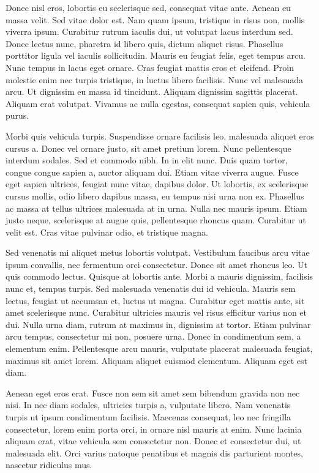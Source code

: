 Donec nisl eros, lobortis eu scelerisque sed, consequat vitae ante. Aenean eu massa velit. Sed vitae dolor est. Nam quam ipsum, tristique in risus non, mollis viverra ipsum. Curabitur rutrum iaculis dui, ut volutpat lacus interdum sed. Donec lectus nunc, pharetra id libero quis, dictum aliquet risus. Phasellus porttitor ligula vel iaculis sollicitudin. Mauris eu feugiat felis, eget tempus arcu. Nunc tempus in lacus eget ornare. Cras feugiat mattis eros et eleifend. Proin molestie enim nec turpis tristique, in luctus libero facilisis. Nunc vel malesuada arcu. Ut dignissim eu massa id tincidunt. Aliquam dignissim sagittis placerat. Aliquam erat volutpat. Vivamus ac nulla egestas, consequat sapien quis, vehicula purus.

Morbi quis vehicula turpis. Suspendisse ornare facilisis leo, malesuada aliquet eros cursus a. Donec vel ornare justo, sit amet pretium lorem. Nunc pellentesque interdum sodales. Sed et commodo nibh. In in elit nunc. Duis quam tortor, congue congue sapien a, auctor aliquam dui. Etiam vitae viverra augue. Fusce eget sapien ultrices, feugiat nunc vitae, dapibus dolor. Ut lobortis, ex scelerisque cursus mollis, odio libero dapibus massa, eu tempus nisi urna non ex. Phasellus ac massa at tellus ultrices malesuada at in urna. Nulla nec mauris ipsum. Etiam justo neque, scelerisque at augue quis, pellentesque rhoncus quam. Curabitur ut velit est. Cras vitae pulvinar odio, et tristique magna.

Sed venenatis mi aliquet metus lobortis volutpat. Vestibulum faucibus arcu vitae ipsum convallis, nec fermentum orci consectetur. Donec sit amet rhoncus leo. Ut quis commodo lectus. Quisque at lobortis ante. Morbi a mauris dignissim, facilisis nunc et, tempus turpis. Sed malesuada venenatis dui id vehicula. Mauris sem lectus, feugiat ut accumsan et, luctus ut magna. Curabitur eget mattis ante, sit amet scelerisque nunc. Curabitur ultricies mauris vel risus efficitur varius non et dui. Nulla urna diam, rutrum at maximus in, dignissim at tortor. Etiam pulvinar arcu tempus, consectetur mi non, posuere urna. Donec in condimentum sem, a elementum enim. Pellentesque arcu mauris, vulputate placerat malesuada feugiat, maximus sit amet lorem. Aliquam aliquet euismod elementum. Aliquam eget est diam.

Aenean eget eros erat. Fusce non sem sit amet sem bibendum gravida non nec nisi. In nec diam sodales, ultricies turpis a, vulputate libero. Nam venenatis turpis ut ipsum condimentum facilisis. Maecenas consequat, leo nec fringilla consectetur, lorem enim porta orci, in ornare nisl mauris at enim. Nunc lacinia aliquam erat, vitae vehicula sem consectetur non. Donec et consectetur dui, ut malesuada elit. Orci varius natoque penatibus et magnis dis parturient montes, nascetur ridiculus mus.

